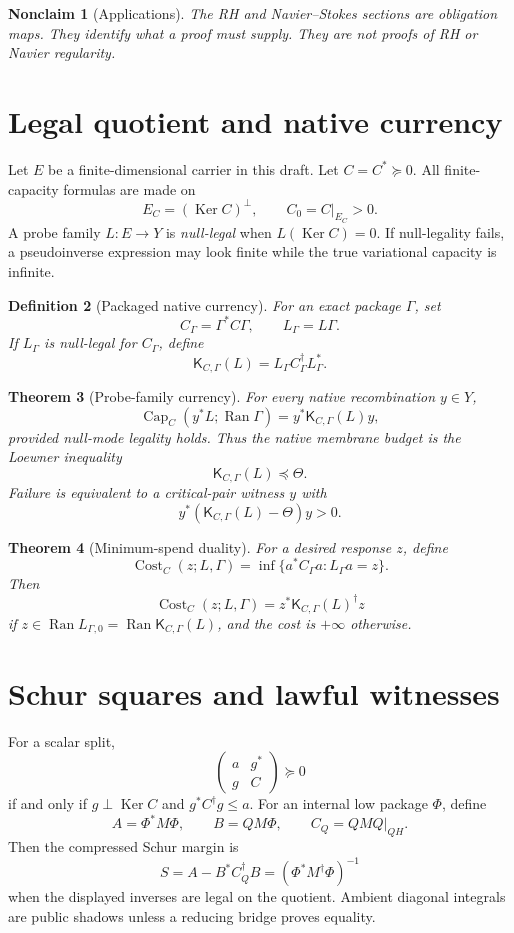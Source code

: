 \documentclass[11pt]{article}
\newtheorem{theorem}{Theorem}[section]
\newtheorem{definition}[theorem]{Definition}
\newtheorem{nonclaim}[theorem]{Nonclaim}
\DeclareMathOperator{\Ran}{Ran}
\DeclareMathOperator{\Ker}{Ker}
\DeclareMathOperator{\Capacity}{Cap}
\DeclareMathOperator{\Cost}{Cost}
\newcommand{\K}{\mathsf K}
\newcommand{\preceqq}{\preceq}
\begin{document}
\begin{nonclaim}[Applications]
The RH and Navier--Stokes sections are obligation maps.  They identify what a proof must supply.  They are not proofs of RH or Navier regularity.
\end{nonclaim}

\section{Legal quotient and native currency}
Let \(E\) be a finite-dimensional carrier in this draft.  Let \(C=C^*\succeq0\).  All finite-capacity formulas are made on
\[
  E_C=(\Ker C)^\perp,\qquad C_0=C|_{E_C}>0.
\]
A probe family \(L:E\to Y\) is \emph{null-legal} when \(L(\Ker C)=0\).  If null-legality fails, a pseudoinverse expression may look finite while the true variational capacity is infinite.

\begin{definition}[Packaged native currency]
For an exact package \(\Gamma\), set
\[
  C_\Gamma=\Gamma^*C\Gamma,\qquad L_\Gamma=L\Gamma.
\]
If \(L_\Gamma\) is null-legal for \(C_\Gamma\), define
\[
  \K_{C,\Gamma}(L)=L_\Gamma C_\Gamma^\dagger L_\Gamma^*.
\]
\end{definition}

\begin{theorem}[Probe-family currency]
For every native recombination \(y\in Y\),
\[
  \Capacity_C(y^*L;\Ran\Gamma)=y^*\K_{C,\Gamma}(L)y,
\]
provided null-mode legality holds.  Thus the native membrane budget is the Loewner inequality
\[
  \K_{C,\Gamma}(L)\preceqq\Theta.
\]
Failure is equivalent to a critical-pair witness \(y\) with
\[
  y^*(\K_{C,\Gamma}(L)-\Theta)y>0.
\]
\end{theorem}

\begin{theorem}[Minimum-spend duality]
For a desired response \(z\), define
\[
  \Cost_C(z;L,\Gamma)=\inf\{a^*C_\Gamma a:L_\Gamma a=z\}.
\]
Then
\[
  \Cost_C(z;L,\Gamma)=z^*\K_{C,\Gamma}(L)^\dagger z
\]
if \(z\in\Ran L_{\Gamma,0}=\Ran \K_{C,\Gamma}(L)\), and the cost is \(+\infty\) otherwise.
\end{theorem}

\section{Schur squares and lawful witnesses}
For a scalar split,
\[
  \begin{pmatrix} a&g^*\\g&C\end{pmatrix}\succeq0
\]
if and only if \(g\perp\Ker C\) and \(g^*C^\dagger g\le a\).  For an internal low package \(\Phi\), define
\[
  A=\Phi^*M\Phi,\qquad B=QM\Phi,\qquad C_Q=QMQ|_{QH}.
\]
Then the compressed Schur margin is
\[
  S=A-B^*C_Q^\dagger B=(\Phi^*M^\dagger\Phi)^{-1}
\]
when the displayed inverses are legal on the quotient.  Ambient diagonal integrals are public shadows unless a reducing bridge proves equality.
\end{document}
